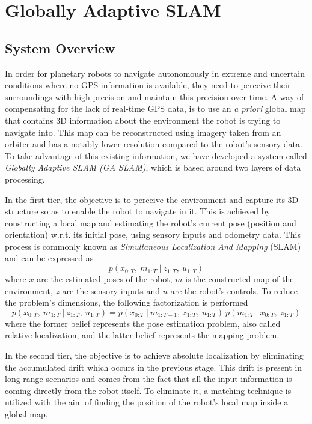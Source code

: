 \label{Chapter2}

\chapter{Globally Adaptive SLAM}

\section{System Overview} \label{system_overview}

In order for planetary robots to navigate autonomously in extreme and
uncertain conditions where no GPS information is available,
they need to perceive their surroundings with high precision and
maintain this precision over time.
A way of compensating for the lack of real-time GPS data, is to use
an \textit{a priori} global map that contains 3D information about the
environment the robot is trying to navigate into.
This map can be reconstructed using imagery taken from an orbiter and
has a notably lower resolution compared to the robot's sensory data.
To take advantage of this existing information, we have developed a system
called \textit{Globally Adaptive SLAM (GA SLAM)},
which is based around two layers of data processing.

In the first tier, the objective is to perceive the environment and
capture its 3D structure so as to enable the robot to navigate in it.
This is achieved by constructing a local map and estimating the robot's
current pose (position and orientation) w.r.t. its initial pose,
using sensory inputs and odometry data.
This process is commonly known as
\textit{Simultaneous Localization And Mapping} (SLAM) and can be expressed as
\begin{equation}
    p(x_{0:T} ,\ m_{1:T} \ | \ z_{1:T} ,\ u_{1:T})
\end{equation}
where
$x$ are the estimated poses of the robot,
$m$ is the constructed map of the environment,
$z$ are the sensory inputs and
$u$ are the robot's controls.
To reduce the problem's dimensions, the following factorization is performed
\begin{equation}
    p(x_{0:T} ,\ m_{1:T} \ | \ z_{1:T} ,\ u_{1:T}) =
    p(x_{0:T} \ | \ m_{1:T-1} ,\ z_{1:T} ,\ u_{1:T}) \
    p(m_{1:T} \ | \ x_{0:T} ,\ z_{1:T})
\end{equation}
where
the former belief represents the pose estimation problem, also called
relative localization, and the latter belief represents the mapping problem.

In the second tier, the objective is to achieve absolute localization by
eliminating the accumulated drift which occurs in the previous stage.
This drift is present in long-range scenarios and comes from the fact that
all the input information is coming directly from the robot itself.
To eliminate it, a matching technique is utilized with the aim of finding the
position of the robot's local map inside a global map.

